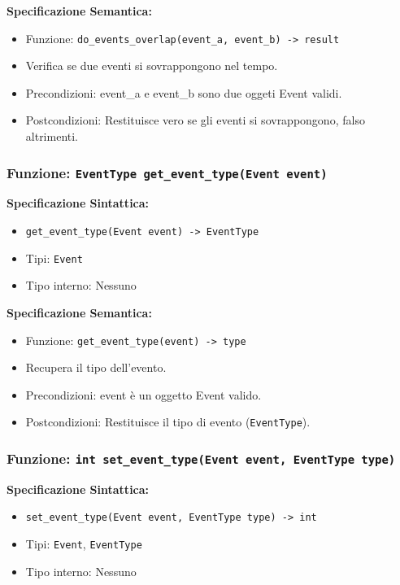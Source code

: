 \documentclass[11pt]{scrartcl} %
\begin{document}
\textbf{Specificazione Semantica:}
\begin{itemize}
\item Funzione: \texttt{do\_events\_overlap(event\_a, event\_b) -> result}
\item Verifica se due eventi si sovrappongono nel tempo.
\item Precondizioni: event\_a e event\_b sono due oggeti Event validi.
\item Postcondizioni: Restituisce vero se gli eventi si sovrappongono, falso altrimenti.
\end{itemize}

\subsubsection{Funzione: \texttt{EventType get\_event\_type(Event event)}}

\textbf{Specificazione Sintattica:}
\begin{itemize}
\item \texttt{get\_event\_type(Event event) -> EventType}
\item Tipi: \texttt{Event}
\item Tipo interno: Nessuno
\end{itemize}

\textbf{Specificazione Semantica:}
\begin{itemize}
\item Funzione: \texttt{get\_event\_type(event) -> type}
\item Recupera il tipo dell'evento.
\item Precondizioni: event è un oggetto Event valido.
\item Postcondizioni: Restituisce il tipo di evento (\texttt{EventType}).
\end{itemize}

\subsubsection{Funzione: \texttt{int set\_event\_type(Event event, EventType type)}}

\textbf{Specificazione Sintattica:}
\begin{itemize}
\item \texttt{set\_event\_type(Event event, EventType type) -> int}
\item Tipi: \texttt{Event}, \texttt{EventType}
\item Tipo interno: Nessuno
\end{itemize}
\end{document}
